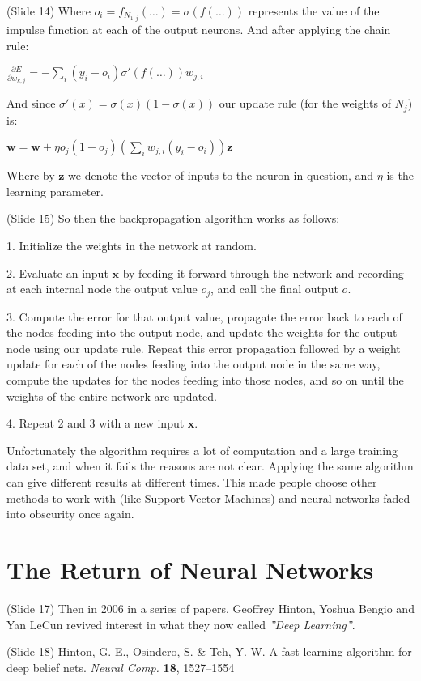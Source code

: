 \documentclass[twocolumn]{article}
\begin{document}
(Slide 14) Where \(o_i = f_{N_{1,j}}(\dots) = \sigma(f(\dots))\) represents the
value of the impulse function at each of the output neurons. And after applying
the chain rule:

\(\displaystyle \frac{\partial E}{\partial w_{k,j}} = -\sum_i (y_i -
o_i)\sigma'(f(\dots)) w_{j,i}\)

And since \(\sigma'(x) = \sigma(x)(1 - \sigma(x))\) our update rule (for the
weights of \(N_j\)) is:

\(\displaystyle \mathbf{w} = \mathbf{w} + \eta o_j(1-o_j) \left ( \sum_i
    w_{j,i} (y_i - o_i) \right ) \mathbf{z}\)

Where by \(\mathbf{z}\) we denote the vector of inputs to the neuron in
question, and \(\eta\) is the learning parameter.

(Slide 15) So then the backpropagation algorithm works as follows:

1. Initialize the weights in the network at random.

2. Evaluate an input \(\mathbf{x}\) by feeding it forward through the network
and recording at each internal node the output value \(o_j\), and call the final
output \(o\).

3. Compute the error for that output value, propagate the error back to each of
the nodes feeding into the output node, and update the weights for the output
node using our update rule. Repeat this error propagation followed by a weight
update for each of the nodes feeding into the output node in the same way,
compute the updates for the nodes feeding into those nodes, and so on until the
weights of the entire network are updated.

4. Repeat 2 and 3 with a new input \(\mathbf{x}\).

Unfortunately the algorithm requires a lot of computation and a large training
data set, and when it fails the reasons are not clear. Applying the same
algorithm can give different results at different times. This made people choose
other methods to work with (like Support Vector Machines) and neural networks
faded into obscurity once again.

\section{The Return of Neural Networks}
(Slide 17)  Then in 2006 in a series of papers,
Geoffrey Hinton, Yoshua Bengio and Yan LeCun revived interest in what they now
called \textit{''Deep Learning”}.

(Slide 18) Hinton, G. E., Osindero, S. \& Teh, Y.-W. A fast learning algorithm
for deep belief nets. \textit{Neural Comp.} \textbf{18}, 1527–1554
\end{document}
